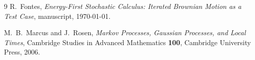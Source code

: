 \documentclass[11pt,reqno]{amsart}
\theoremstyle{plain}
\theoremstyle{definition}
\theoremstyle{remark}
\begin{document}
\begin{thebibliography}{9}
R.~Fontes, \emph{Energy-First Stochastic Calculus: Iterated Brownian
Motion as a Test Case}, manuscript, \today.

M.~B.~Marcus and J.~Rosen, \emph{Markov Processes, Gaussian
Processes, and Local Times}, Cambridge Studies in Advanced
Mathematics \textbf{100}, Cambridge University Press, 2006.
\end{thebibliography}
\end{document}
